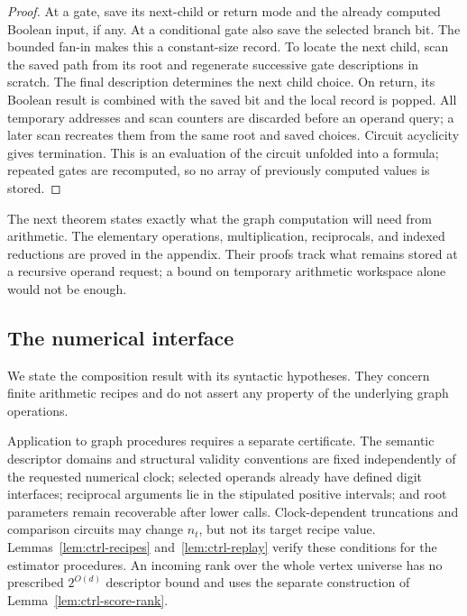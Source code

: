 \documentclass[11pt]{article}
\numberwithin{equation}{section}
\theoremstyle{definition}
\theoremstyle{remark}
\begin{document}
\begin{proof}
At a gate, save its next-child or return mode and the already computed
Boolean input, if any.  At a conditional gate also save the selected
branch bit.  The bounded fan-in makes this a constant-size
record.  To locate the next child, scan the saved path from its root
and regenerate successive gate descriptions in scratch.  The final
description determines the next child choice.  On return, its Boolean
result is combined with the saved bit and the local record is popped.
All temporary addresses and scan counters are discarded before an
operand query; a later scan recreates them from the same root and
saved choices.  Circuit acyclicity gives termination.  This is an
evaluation of the circuit unfolded into a formula; repeated gates are
recomputed, so no array of previously computed values is stored.
\end{proof}


The next theorem states exactly what the graph computation will need from arithmetic. The elementary operations, multiplication, reciprocals, and indexed reductions are proved in the appendix. Their proofs track what remains stored at a recursive operand request; a bound on temporary arithmetic workspace alone would not be enough.

\subsection{The numerical interface}


We state the composition result with its syntactic hypotheses.
They concern finite arithmetic recipes and do not assert any
property of the underlying graph operations.

Application to graph procedures requires a separate certificate.  The
semantic descriptor domains and structural validity conventions are
fixed independently of the requested numerical clock; selected operands
already have defined digit interfaces; reciprocal arguments lie in the
stipulated positive intervals; and root parameters remain recoverable
after lower calls.  Clock-dependent truncations and comparison circuits
may change ${n}_t$, but not its target recipe value.
Lemmas~\ref{lem:ctrl-recipes} and~\ref{lem:ctrl-replay} verify these
conditions for the estimator procedures.  An incoming rank over the
whole vertex universe has no prescribed $2^{O(d)}$ descriptor bound and
uses the separate construction of Lemma~\ref{lem:ctrl-score-rank}.
\end{document}
